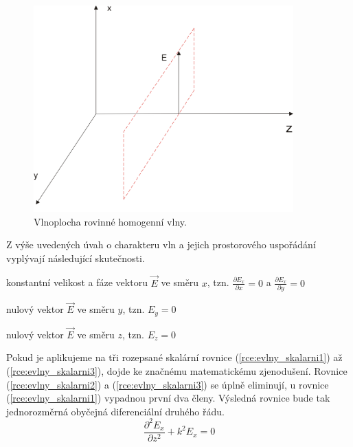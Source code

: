 \begin{figure}[!h]
	\centering
	\includegraphics[width=10cm]{evlny_vlnoplocha.png}
	\caption{Vlnoplocha rovinné homogenní vlny. \cite{emp}}
	\label{obr:evlny_vlnoplocha}
\end{figure}

Z výše uvedených úvah o charakteru vln a jejich prostorového uspořádání vyplývají následující skutečnosti.
\begin{itemize*}
\item konstantní velikost a fáze vektoru $\vec E$ ve směru $x$, tzn. $\frac{\partial  E_{x}}{\partial x}=0$ a $\frac{\partial  E_{x}}{\partial y}=0$
\item nulový vektor $\vec E$ ve směru $y$, tzn. $ E_{y} = 0$
\item nulový vektor $\vec E$ ve směru $z$, tzn. $ E_{z} = 0$
\end{itemize*}
Pokud je aplikujeme na tři rozepsané skalární rovnice (\ref{rce:evlny_skalarni1}) až (\ref{rce:evlny_skalarni3}), dojde ke značnému matematickému zjenodušení. Rovnice (\ref{rce:evlny_skalarni2}) a (\ref{rce:evlny_skalarni3}) se úplně eliminují, u rovnice (\ref{rce:evlny_skalarni1}) vypadnou první dva členy. Výsledná rovnice bude tak jednorozměrná obyčejná diferenciální druhého řádu.
\begin{equation}
	\frac{\partial ^{2} E_{x}}{\partial z^{2}} + k^{2} E_{x} = 0
	\label{rce:evlny_skalarni}	
\end{equation}

